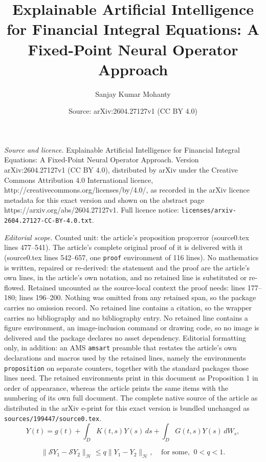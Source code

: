\documentclass[10pt,a4paper]{amsart}
\title{Explainable Artificial Intelligence for Financial Integral Equations: A Fixed-Point Neural Operator Approach}
\author{Sanjay Kumar Mohanty}
\date{Source: arXiv:2604.27127v1 (CC BY 4.0)}
\begin{document}
\maketitle

\noindent\emph{Source and licence.} Explainable Artificial Intelligence for Financial Integral Equations: A Fixed-Point Neural Operator Approach. Version arXiv:2604.27127v1 (CC BY 4.0), distributed by arXiv under the Creative Commons Attribution 4.0 International licence, http://creativecommons.org/licenses/by/4.0/, as recorded in the arXiv licence metadata for this exact version and shown on the abstract page https://arxiv.org/abs/2604.27127v1. Full licence notice: \texttt{licenses/arxiv-2604.27127-CC-BY-4.0.txt}.\par\smallskip

\noindent\textit{Editorial scope.} Counted unit: the article's proposition prop:error (source0.tex lines 477--541). The article's complete original proof of it is delivered with it (source0.tex lines 542--657, one \texttt{proof} environment of 116 lines). No mathematics is written, repaired or re-derived: the statement and the proof are the article's own lines, in the article's own notation, and no retained line is substituted or re-flowed.  Retained uncounted as the source-local context the proof needs: lines 177--180; lines 196--200.  Nothing was omitted from any retained span, so the package carries no omission record.  No retained line contains a citation, so the wrapper carries no bibliography and no bibliography entry.  No retained line contains a figure environment, an image-inclusion command or drawing code, so no image is delivered and the package declares no asset dependency.  Editorial formatting only, in addition: an AMS \texttt{amsart} preamble that restates the article's own declarations and macros used by the retained lines, namely the environments \texttt{proposition} on separate counters, together with the standard packages those lines need.  The retained environments print in this document as Proposition 1 in order of appearance, whereas the article prints the same items with the numbering of its own full document.  The complete native source of the article as distributed in the arXiv e-print for this exact version is bundled unchanged as \texttt{sources/199447/source0.tex}.
\begin{equation}
	Y(t) = g(t) + \int_D K(t,s) Y(s)\, ds 
	+ \int_D G(t,s) Y(s)\, dW_s, \label{eq:1}
\end{equation}

\begin{equation}
	\|\mathcal{S}Y_1 - \mathcal{S}Y_2\|_{\mathcal{H}}
	\le q \|Y_1 - Y_2\|_{\mathcal{H}},\;\;\;\; \text{for some,}\;\; 0 < q < 1.  
	\label{eq:2}
\end{equation}
\end{document}
